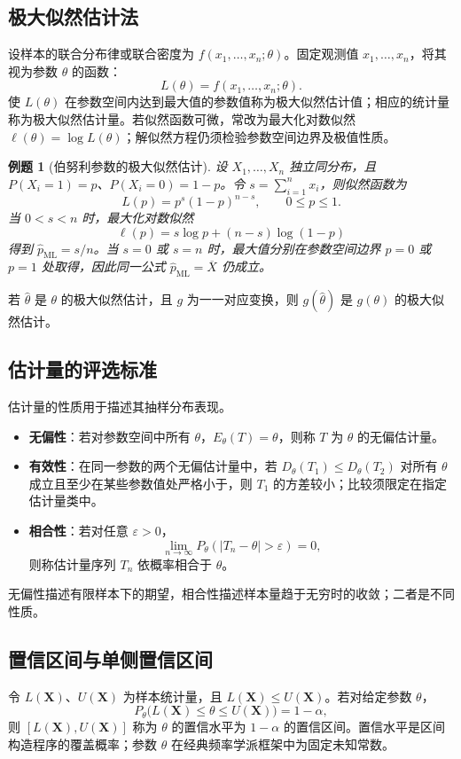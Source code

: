 \documentclass[11pt,a4paper,fontset=fandol]{ctexart}
\newtheorem{example}{例题}[section]
\theoremstyle{remark}
\begin{document}
\subsection{极大似然估计法}
设样本的联合分布律或联合密度为 $f(x_1,\ldots,x_n;\theta)$。固定观测值 $x_1,\ldots,x_n$，将其视为参数 $\theta$ 的函数：
\[
    L(\theta)=f(x_1,\ldots,x_n;\theta).
\]
使 $L(\theta)$ 在参数空间内达到最大值的参数值称为极大似然估计值；相应的统计量称为极大似然估计量。若似然函数可微，常改为最大化对数似然 $\ell(\theta)=\log L(\theta)$；解似然方程仍须检验参数空间边界及极值性质。

\begin{example}[伯努利参数的极大似然估计]
设 $X_1,\ldots,X_n$ 独立同分布，且 $P(X_i=1)=p$、$P(X_i=0)=1-p$。令 $s=\sum_{i=1}^{n}x_i$，则似然函数为
\[
    L(p)=p^s(1-p)^{n-s},\qquad 0\leq p\leq1.
\]
当 $0<s<n$ 时，最大化对数似然
\[
    \ell(p)=s\log p+(n-s)\log(1-p)
\]
得到 $\widehat p_{\mathrm{ML}}=s/n$。当 $s=0$ 或 $s=n$ 时，最大值分别在参数空间边界 $p=0$ 或 $p=1$ 处取得，因此同一公式 $\widehat p_{\mathrm{ML}}=\overline X$ 仍成立。
\end{example}

若 $\widehat\theta$ 是 $\theta$ 的极大似然估计，且 $g$ 为一一对应变换，则 $g(\widehat\theta)$ 是 $g(\theta)$ 的极大似然估计。

\subsection{估计量的评选标准}
估计量的性质用于描述其抽样分布表现。
\begin{itemize}
    \item \textbf{无偏性}：若对参数空间中所有 $\theta$，$E_\theta(T)=\theta$，则称 $T$ 为 $\theta$ 的无偏估计量。
    \item \textbf{有效性}：在同一参数的两个无偏估计量中，若 $D_\theta(T_1)\leq D_\theta(T_2)$ 对所有 $\theta$ 成立且至少在某些参数值处严格小于，则 $T_1$ 的方差较小；比较须限定在指定估计量类中。
    \item \textbf{相合性}：若对任意 $\varepsilon>0$，
    \[
        \lim_{n\to\infty}P_\theta(|T_n-\theta|>\varepsilon)=0,
    \]
    则称估计量序列 $T_n$ 依概率相合于 $\theta$。
\end{itemize}
无偏性描述有限样本下的期望，相合性描述样本量趋于无穷时的收敛；二者是不同性质。

\subsection{置信区间与单侧置信区间}
令 $L(\bm X)$、$U(\bm X)$ 为样本统计量，且 $L(\bm X)\leq U(\bm X)$。若对给定参数 $\theta$，
\[
    P_\theta\bigl(L(\bm X)\leq\theta\leq U(\bm X)\bigr)=1-\alpha,
\]
则 $[L(\bm X),U(\bm X)]$ 称为 $\theta$ 的置信水平为 $1-\alpha$ 的置信区间。置信水平是区间构造程序的覆盖概率；参数 $\theta$ 在经典频率学派框架中为固定未知常数。
\end{document}
